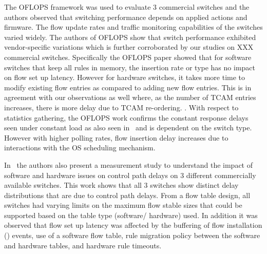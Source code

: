 The OFLOPS framework was used to evaluate 3 commercial switches and the authors observed that switching performance depends on applied actions and firmware. 
The flow update rates and traffic monitoring capabilities of the switches varied widely. 
The authors of OFLOPS show that switch performance exhibited vendor-specific variations which is further corroborated by our studies on XXX commercial switches. 
Specifically the OFLOPS paper showed that for software switches that keep all rules in memory, the insertion rate or type has no impact on flow set up latency. 
However for hardware switches, it takes more time to modify existing flow entries
as compared to adding new flow entries. This is in agreement with our observations as well where, as the number of TCAM entries increases, 
there is more delay due to TCAM re-ordering. 
. 
With respect to statistics gathering, the OFLOPS work confirms the constant response delays seen under constant load as also seen in~\cite{devoflow} and 
is dependent on the switch type. However with higher polling rates, flow insertion delay increases due to interactions with the OS scheduling mechanism. 

In~\cite{ucsdpaper} the authors also present a measurement study to understand the impact of software and hardware issues on control path delays on 3 different 
commercially available switches. This work shows that all 3 switches show distinct delay distributions that are due to control path delays. 
From a flow table design, all switches had varying limits on the maximum flow stable sizes that could be supported based on the table type (software/ hardware) used. 
In addition it was observed that flow set up latency was affected by the buffering of flow installation (\flowmod) events, 
use of a software flow table, rule migration policy between the software and hardware tables, and hardware rule timeouts. 

